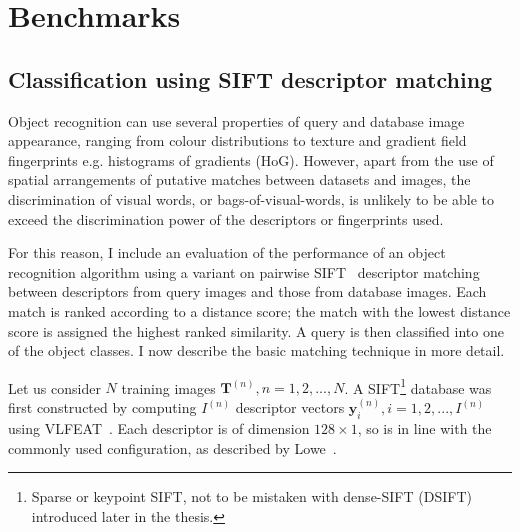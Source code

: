 \section{Benchmarks} \label{sec:benchmarks}




\subsection{Classification using SIFT descriptor matching}

Object recognition can use several properties of query and da\-ta\-ba\-se image appearance, ranging from colour distributions to texture and gradient field fingerprints e.g. histograms of gradients (HoG). However, apart from the use of spatial arrangements of putative matches between datasets and images, the discrimination of visual words, or bags-of-visual-words, is unlikely to be able to exceed the discrimination power of the descriptors or fingerprints used.

For this reason, I include an evaluation of the performance of an object recognition algorithm using a variant on pairwise SIFT~\cite{lowe2004distinctive} descriptor matching between descriptors from query images and those from database images. Each match is ranked according to a distance score; the match with the lowest distance score is assigned the highest ranked similarity. A query is then classified into one of the object classes. I now describe the basic matching technique in more detail.

Let us consider $N$ training images $\mathbf{T}^{(n)}, n = 1, 2, ..., N$. A SIFT\footnote{Sparse or keypoint SIFT, not to be mistaken with dense-SIFT (DSIFT) introduced later in the thesis.} database was first constructed by computing $I^{(n)}$ descriptor vectors $\mathbf{y}_i^{(n)}, i = 1, 2, ..., I^{(n)}$ using VLFEAT~\cite{Vedaldi2008}. Each descriptor is of dimension $128\times 1$, so is in line with the commonly used configuration, as described by Lowe~\cite{lowe2004distinctive}.

